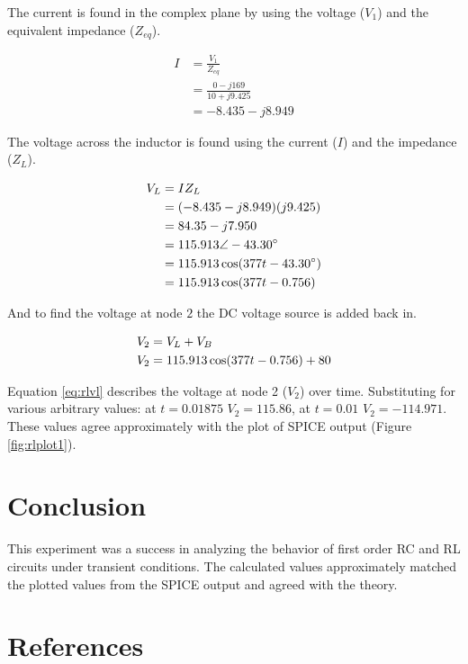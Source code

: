 \documentclass{article}
\begin{document}
The current is found in the complex plane by using the voltage ($V_1$) and
the equivalent impedance ($Z_{eq}$).

\begin{align*}
	I &= \frac{V_1}{Z_{eq}} \\
		&= \frac{0 - j169}{10 + j 9.425} \\
		&= -8.435 - j 8.949
\end{align*}

The voltage across the inductor is found using the current ($I$) and
the impedance ($Z_L$).

\begin{align}
	V_L &= I Z_L \notag \\
		&= (-8.435 - j 8.949)(j 9.425) \notag \\
		&= 84.35 - j 7.950 \notag \\
		&= 115.913 \angle -43.30^{\circ} \notag \\
		&= 115.913 \cos(377t - 43.30^{\circ}) \notag \\
		&= 115.913 \cos(377t - 0.756) \notag
\end{align}

And to find the voltage at node $2$ the DC voltage source is added back in.

\begin{align}
	V_2 &= V_L + V_B \notag \\
	V_2 &= 115.913 \cos(377t - 0.756) + 80  \label{eq:rlvl} 
\end{align}

Equation \ref{eq:rlvl} describes the voltage at node 2 ($V_2$)
over time.
Substituting for various arbitrary values:
at $t = 0.01875$ $V_2 = 115.86$, at $t = 0.01$ $V_2 = -114.971$.
These values agree approximately with the plot of SPICE output (Figure \ref{fig:rlplot1}).



\section{Conclusion}

This experiment was a success in analyzing the behavior of first order
RC and RL circuits under transient conditions.
The calculated values approximately matched the plotted values from
the SPICE output and agreed with the theory.



\renewcommand*{\refname}{\vspace{-8mm}}
\section{References}


\end{document}
